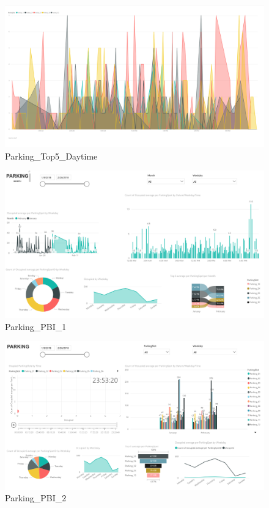 \documentclass[11pt]{article}
\makeatletter
\def\maxwidth{\ifdim\Gin@nat@width>\linewidth\linewidth
    \else\Gin@nat@width\fi}
\let\Oldincludegraphics\includegraphics
\renewcommand{\includegraphics}[1]{\Oldincludegraphics[width=.8\maxwidth]{#1}}
\makeatother
\begin{document}
    \begin{figure}
\centering
\includegraphics{images/7_parking_top5_daytime.PNG}
\caption{Parking\_Top5\_Daytime}
\end{figure}

    \begin{figure}
\centering
\includegraphics{images/_powerBI_slides/01_parking.PNG}
\caption{Parking\_PBI\_1}
\end{figure}

    \begin{figure}
\centering
\includegraphics{images/_powerBI_slides/02_parking.PNG}
\caption{Parking\_PBI\_2}
\end{figure}
\end{document}
